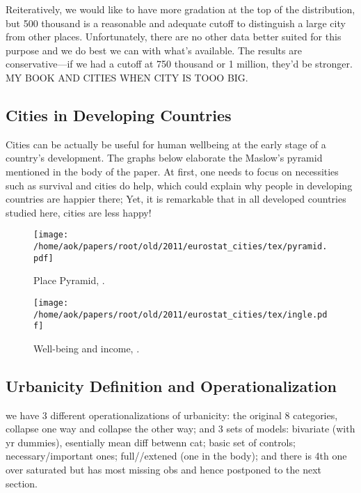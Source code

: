 \documentclass[10pt, letterpaper]{article}
\begin{document}
\begin{spacing}{1.4}
Reiteratively, we would like to have more gradation at the top of the distribution, but 500 thousand is a reasonable and adequate cutoff to distinguish a large city from other places. Unfortunately, there are no other data better suited for this purpose and we do best we can with what's available. The results are conservative---if we had a cutoff at 750 thousand or 1 million, they'd be stronger. MY BOOK AND CITIES WHEN CITY IS TOOO BIG. 

\subsection*{Cities in Developing Countries}

Cities can be actually be useful for human wellbeing at the early stage of a country's development. The graphs below elaborate the Maslow's pyramid mentioned in the body of the paper. At first, one needs to focus on necessities such as survival and cities do help, which could explain why people in developing countries are happier there; Yet, it is remarkable that in all developed countries studied here, cities are less happy!

\begin{figure}[h!]
\begin{centering}
 \texttt{[image: /home/aok/papers/root/old/2011/eurostat\_cities/tex/pyramid.pdf]}
 \caption{Place Pyramid, \citep[p 294]{florida08}.} \label{pyramid}
  \end{centering}
\end{figure}

\begin{figure}[h!]
\begin{centering}
 \texttt{[image: /home/aok/papers/root/old/2011/eurostat\_cities/tex/ingle.pdf]}
 \caption{Well-being and income, \citep{inglehart97}.} \label{ingle}
  \end{centering}
\end{figure}


\subsection*{Urbanicity Definition and Operationalization} 

we have 3 different operationalizations of urbanicity: the original 8 categories, collapse
one way and collapse the other way; and 3 sets of models: bivariate (with yr
dummies), esentially mean diff betwenn cat; basic set of controls;
necessary/important ones; full//extened (one in the body); and there is 4th one
over saturated but has most missing obs and hence postponed to the next section. 


\end{spacing}
\end{document}
